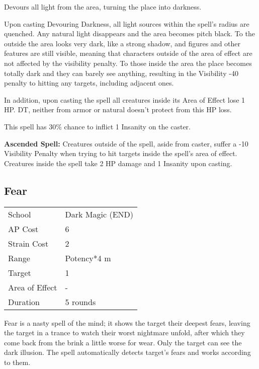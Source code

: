 \documentclass[11pt,a4paper,twocolumn]{book}
\begin{document}
\medskip

Devours all light from the area, turning the place into darkness.

Upon casting Devouring Darkness, all light sources within the spell's radius are quenched. Any natural light disappears and the area becomes pitch black. To the outside the area looks very dark, like a strong shadow, and figures and other features are still visible, meaning that characters outside of the area of effect are not affected by the visibility penalty. To those inside the area the place becomes totally dark and they can barely see anything, resulting in the Visibility -40 penalty to hitting any targets, including adjacent ones.

In addition, upon casting the spell all creatures inside its Area of Effect lose 1 HP. DT, neither from armor or natural doesn't protect from this HP loss.

This spell has 30\% chance to inflict 1 Insanity on the caster.

\bigskip

\textbf{Ascended Spell:} Creatures outside of the spell, aside from caster, suffer a -10 Visibility Penalty when trying to hit targets inside the spell's area of effect. Creatures inside the spell take 2 HP damage and 1 Insanity upon casting.

\vfill

\subsection*{Fear}
{
	\begin{tabu} to 75mm{| X[l,4] | X[l,7] |}
		\hline
		School 			& Dark Magic (END)		\\
		AP Cost	      	& 6 					\\
		Strain Cost     & 2 					\\
		Range     		& Potency*4 m 			\\
		Target      	& 1						\\
		Area of Effect  & -  	 				\\
		Duration     	& 5 rounds 				\\ \hline
	\end{tabu}
	
}

\medskip

Fear is a nasty spell of the mind; it shows the target their deepest fears, leaving the target in a trance to watch their worst nightmare unfold, after which they come back from the brink a little worse for wear. Only the target can see the dark illusion. The spell automatically detects target's fears and works according to them.
\end{document}
